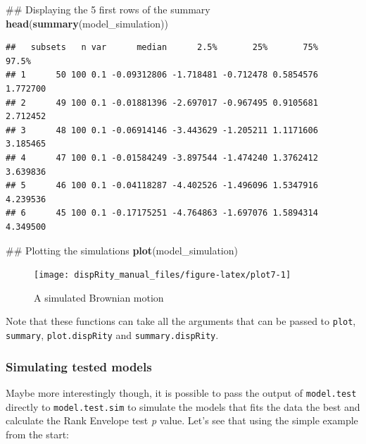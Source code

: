 \documentclass[]{book}
\newenvironment{Shaded}{\begin{snugshade}}{\end{snugshade}}
\newcommand{\KeywordTok}[1]{\textcolor[rgb]{0.13,0.29,0.53}{\textbf{#1}}}
\newcommand{\NormalTok}[1]{#1}
\theoremstyle{definition}
\theoremstyle{definition}
\theoremstyle{definition}
\theoremstyle{remark}
\begin{document}
\begin{Shaded}
\begin{Highlighting}[]
\NormalTok{## Displaying the 5 first rows of the summary}
\KeywordTok{head}\NormalTok{(}\KeywordTok{summary}\NormalTok{(model_simulation))}
\end{Highlighting}
\end{Shaded}

\begin{verbatim}
##   subsets   n var      median      2.5%       25%       75%    97.5%
## 1      50 100 0.1 -0.09312806 -1.718481 -0.712478 0.5854576 1.772700
## 2      49 100 0.1 -0.01881396 -2.697017 -0.967495 0.9105681 2.712452
## 3      48 100 0.1 -0.06914146 -3.443629 -1.205211 1.1171606 3.185465
## 4      47 100 0.1 -0.01584249 -3.897544 -1.474240 1.3762412 3.639836
## 5      46 100 0.1 -0.04118287 -4.402526 -1.496096 1.5347916 4.239536
## 6      45 100 0.1 -0.17175251 -4.764863 -1.697076 1.5894314 4.349500
\end{verbatim}

\begin{Shaded}
\begin{Highlighting}[]
\NormalTok{## Plotting the simulations}
\KeywordTok{plot}\NormalTok{(model_simulation)}
\end{Highlighting}
\end{Shaded}

\begin{figure}

{\centering \texttt{[image: dispRity\_manual\_files/figure-latex/plot7-1]} 

}

\caption{A simulated Brownian motion}\label{fig:plot7}
\end{figure}

Note that these functions can take all the arguments that can be passed
to \texttt{plot}, \texttt{summary}, \texttt{plot.dispRity} and
\texttt{summary.dispRity}.

\subsubsection{Simulating tested models}\label{simulating-tested-models}

Maybe more interestingly though, it is possible to pass the output of
\texttt{model.test} directly to \texttt{model.test.sim} to simulate the
models that fits the data the best and calculate the Rank Envelope test
\emph{p} value. Let's see that using the simple example from the start:
\end{document}
